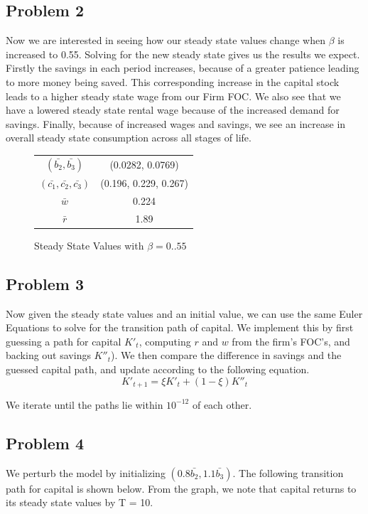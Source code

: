 \documentclass{article}
\begin{document}
	\newpage
	\subsection*{Problem 2}
	Now we are interested in seeing how our steady state values change when $\beta$ is increased to 0.55. Solving for the new steady state gives us the results we expect. Firstly the savings in each period increases, because of a greater patience leading to more money being saved. This corresponding increase in the capital stock leads to a higher steady state wage from our Firm FOC. We also see that we have a lowered steady state rental wage because of the increased demand for savings. Finally, because of increased wages and savings, we see an increase in overall steady state consumption across all stages of life.
	
	\begin{figure}[!h]
		\centering
		\caption{Steady State Values with $\beta = 0..55$}
		\begin{tabular}{c | c}
			$(\bar{b_2}, \bar{b_3})$ & (0.0282, 0.0769) \\
			$(\bar{c_1}, \bar{c_2}, \bar{c_3})$ & (0.196, 0.229, 0.267) \\
			$\bar{w}$ & 0.224 \\
			$\bar{r}$ & 1.89 			
		\end{tabular}
	\end{figure}
	
	\subsection*{Problem 3}
	Now given the steady state values and an initial value, we can use the same Euler Equations to solve for the transition path of capital. We implement this by first guessing a path for capital $K'_t$, computing $r$ and $w$ from the firm's FOC's, and backing out savings $K''_t$). We then compare the difference in savings and the guessed capital path, and update according to the following equation.
	\[ K'_{t+1} = \xi K'_t + (1 - \xi) K''_t \]
	
	We iterate until the paths lie within $10^{-12}$ of each other.
	
	\newpage
	\subsection*{Problem 4}
	We perturb the model by initializing $(0.8 \bar{b_2}, 1.1 \bar{b_3})$. The following transition path for capital is shown below. From the graph, we note that capital returns to its steady state values by T = 10.
	
\end{document}
